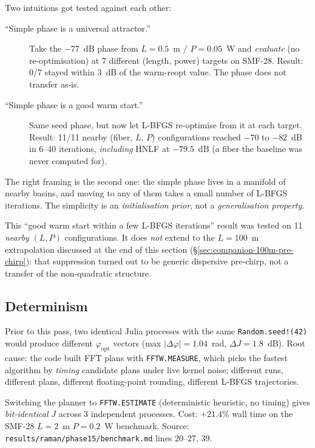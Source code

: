 \documentclass[12pt,a4paper]{article}
\begin{document}
Two intuitions got tested against each other:
\begin{description}
  \item[``Simple phase is a universal attractor.''] Take the
    $-77$~dB phase from $L = 0.5$~m / $P = 0.05$~W and
    \emph{evaluate} (no re-optimisation) at 7 different
    (length, power) targets on SMF-28. Result: 0/7 stayed within
    3~dB of the warm-reopt value. The phase does not transfer as-is.
  \item[``Simple phase is a good warm start.''] Same seed phase,
    but now let L-BFGS re-optimise from it at each target. Result:
    11/11 nearby (fiber, $L$, $P$) configurations reached $-70$ to
    $-82$~dB in 6--40 iterations, \emph{including} HNLF at $-79.5$~dB
    (a fiber the baseline was never computed for).
\end{description}

The right framing is the second one: the simple phase lives in a
manifold of nearby basins, and moving to any of them takes a small
number of L-BFGS iterations. The simplicity is an
\emph{initialisation prior}, not a \emph{generalisation property}.

\begin{warning}
This ``good warm start within a few L-BFGS iterations''
result was tested on 11 \emph{nearby} $(L, P)$ configurations. It
does \emph{not} extend to the $L = 100$~m extrapolation discussed
at the end of this section (§\ref{sec:companion-100m-pre-chirp}):
that suppression turned out to be generic dispersive pre-chirp,
not a transfer of the non-quadratic structure.
\end{warning}

\subsection{Determinism}

Prior to this pass, two identical Julia processes with the same
\texttt{Random.seed!(42)} would produce different $\varphi_{\text{opt}}$
vectors (max $|\Delta\varphi| = 1.04$~rad, $\Delta J = 1.8$~dB).
Root cause: the code built FFT plans with \texttt{FFTW.MEASURE}, which
picks the fastest algorithm by \emph{timing} candidate plans under
live kernel noise; different runs, different plans, different
floating-point rounding, different L-BFGS trajectories.

Switching the planner to \texttt{FFTW.ESTIMATE} (deterministic
heuristic, no timing) gives \emph{bit-identical} $J$ across 3
independent processes. Cost: $+21.4\%$ wall time on the SMF-28
$L = 2$~m $P = 0.2$~W benchmark. Source:
\texttt{results/raman/phase15/benchmark.md} lines 20--27, 39.
\end{document}
